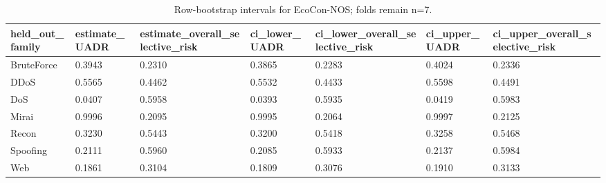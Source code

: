 \begin{table}
\caption{Row-bootstrap intervals for EcoCon-NOS; folds remain n=7.}
\label{tab:table11_bootstrap_ci}
\begin{tabular}{lllllll}
\toprule
held\_out\_family & estimate\_UADR & estimate\_overall\_selective\_risk & ci\_lower\_UADR & ci\_lower\_overall\_selective\_risk & ci\_upper\_UADR & ci\_upper\_overall\_selective\_risk \\
\midrule
BruteForce & 0.3943 & 0.2310 & 0.3865 & 0.2283 & 0.4024 & 0.2336 \\
DDoS & 0.5565 & 0.4462 & 0.5532 & 0.4433 & 0.5598 & 0.4491 \\
DoS & 0.0407 & 0.5958 & 0.0393 & 0.5935 & 0.0419 & 0.5983 \\
Mirai & 0.9996 & 0.2095 & 0.9995 & 0.2064 & 0.9997 & 0.2125 \\
Recon & 0.3230 & 0.5443 & 0.3200 & 0.5418 & 0.3258 & 0.5468 \\
Spoofing & 0.2111 & 0.5960 & 0.2085 & 0.5933 & 0.2137 & 0.5984 \\
Web & 0.1861 & 0.3104 & 0.1809 & 0.3076 & 0.1910 & 0.3133 \\
\bottomrule
\end{tabular}
\end{table}
